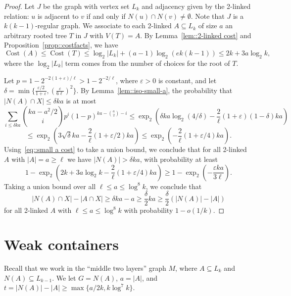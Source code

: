 \documentclass[12pt]{article}
\newcommand{\ep}{\varepsilon}
\DeclareMathOperator{\cost}{Cost}
\begin{document}
\begin{proof}
Let $J$ be the graph with vertex set $L_k$ and adjacency given by the 2-linked relation: $u$ is adjacent to $v$ if and only if $N(u) \cap N(v) \neq \emptyset$. Note that $J$ is a $k(k-1)$-regular graph. We associate to each 2-linked $A \subseteq L_k$ of size $a$ an arbitrary rooted tree $T$ in $J$ with $V(T) = A$. By Lemma~\ref{lem::2-linked cost} and Proposition~\ref{prop::costfacts}, we have
\begin{equation}\label{eq::small a cost}
\cost(A) \leq \cost(T) \leq \log_2 |L_k| + (a-1)\log_2(ek(k-1)) \leq 2k + 3 a \log_2 k ,
\end{equation}
where the $\log_2 |L_k|$ term comes from the number of choices for the root of $T$.

Let $p = 1-2^{-2(1+\ep)/\ell} > 1-2^{-2/\ell}$, where $\ep>0$ is constant, and let $\delta = \min\{\frac{\ep/2}{1+\ep},(\frac{\ep}{6\ell})^2\}$. By Lemma~\ref{lem::iso-small-a}, the probability that $|N(A) \cap X| \leq \delta ka$ is at most
\[ \sum_{i\leq \delta ka} \binom{ka - a^2/2}{i} p^{i} (1-p)^{ka - \binom{a}{2} - i} \leq \exp_2\left( \delta k a \log_2(4/\delta) - \frac{2}{\ell}(1+\ep)(1-\delta)ka \right) \]
\[ \leq \exp_2\left( 3\sqrt{\delta} ka - \frac{2}{\ell}(1+\ep/2) ka \right) \leq \exp_2 \left( -\frac{2}{\ell}(1+\ep/4) ka \right) .\]
Using~\eqref{eq::small a cost} to take a union bound, we conclude that for all 2-linked $A$ with $|A| = a \geq \ell$ we have $|N(A)| > \delta ka$, with probability at least
\[ 1 - \exp_2\left( 2k + 3a \log_2 k - \frac{2}{\ell} (1+\ep/4)ka \right) \geq 1 - \exp_2\left( -\frac{\ep ka}{3\ell} \right) .\]
Taking a union bound over all $\ell \leq a \leq \log^8 k$, we conclude that
\[ |N(A) \cap X| - |A \cap X| \geq \delta ka - a \geq \frac{\delta}{2} ka \geq \frac{\delta}{2}(|N(A)|-|A|) \]
for all 2-linked $A$ with $\ell \leq a \leq \log^8 k$ with probability $1-o(1/k)$.
\end{proof}











\section{Weak containers}\label{sec::weak}

Recall that we work in the ``middle two layers'' graph $M$, where $A \subseteq L_k$ and $N(A) \subseteq L_{k-1}$. We let $G = N(A)$, $a = |A|$, and $t = |N(A)|-|A| \geq \max\{a/2k, k\log^7 k\}$.
\end{document}
